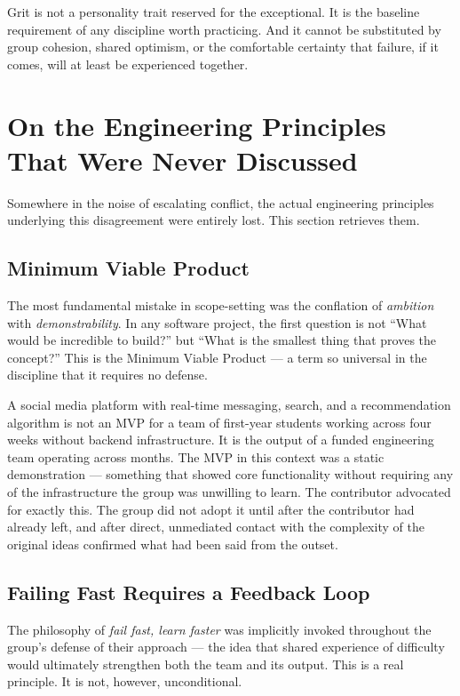 \documentclass[11pt,a4paper]{book}
\begin{document}
Grit is not a personality trait reserved for the exceptional. It is the baseline requirement of any discipline worth practicing. And it cannot be substituted by group cohesion, shared optimism, or the comfortable certainty that failure, if it comes, will at least be experienced together.

\section{On the Engineering Principles That Were Never Discussed}

Somewhere in the noise of escalating conflict, the actual engineering principles underlying this disagreement were entirely lost. This section retrieves them.

\subsection{Minimum Viable Product}

The most fundamental mistake in scope-setting was the conflation of \emph{ambition} with \emph{demonstrability}. In any software project, the first question is not ``What would be incredible to build?'' but ``What is the smallest thing that proves the concept?'' This is the Minimum Viable Product --- a term so universal in the discipline that it requires no defense.

A social media platform with real-time messaging, search, and a recommendation algorithm is not an MVP for a team of first-year students working across four weeks without backend infrastructure. It is the output of a funded engineering team operating across months. The MVP in this context was a static demonstration --- something that showed core functionality without requiring any of the infrastructure the group was unwilling to learn. The contributor advocated for exactly this. The group did not adopt it until after the contributor had already left, and after direct, unmediated contact with the complexity of the original ideas confirmed what had been said from the outset.

\subsection{Failing Fast Requires a Feedback Loop}

The philosophy of \emph{fail fast, learn faster} was implicitly invoked throughout the group's defense of their approach --- the idea that shared experience of difficulty would ultimately strengthen both the team and its output. This is a real principle. It is not, however, unconditional.
\end{document}

